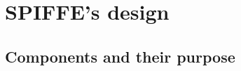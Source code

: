 \section{SPIFFE's design}\label{sec-components}

\subsection{Components and their purpose}
\label{sec-component}

